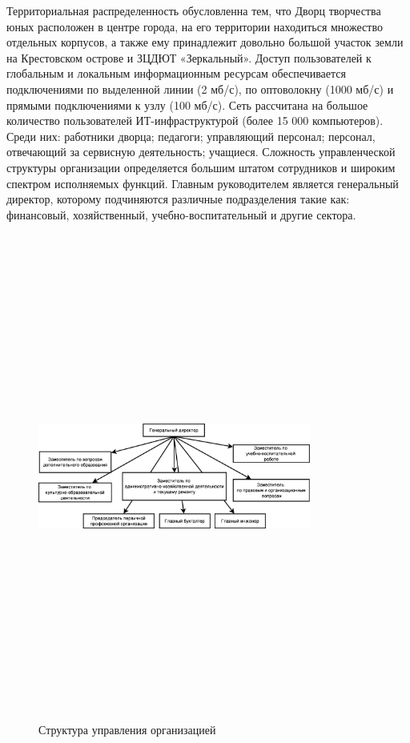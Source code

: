 \documentclass[utf8,usehyperref,12pt]{G7-32}
\begin{document}
Территориальная распределенность обусловленна тем, что Дворц творчества юных расположен в центре города, на его территории находиться множество отдельных корпусов, а также ему принадлежит довольно большой участок земли на Крестовском острове и ЗЦДЮТ «Зеркальный». Доступ пользователей к глобальным и локальным информационным ресурсам обеспечивается подключениями по выделенной линии
(2 мб/с), по оптоволокну (1000 мб/с) и прямыми подключениями к узлу (100 мб/с). Сеть рассчитана на большое количество пользователей ИТ-инфраструктурой (более
15 000 компьютеров). Среди них: работники дворца; педагоги; управляющий персонал;  персонал, отвечающий за сервисную деятельность; учащиеся. Сложность управленческой структуры организации определяется большим штатом сотрудников и широким спектром исполняемых функций. Главным руководителем является генеральный директор, которому подчиняются различные подразделения такие как: финансовый, хозяйственный, учебно-воспитательный и другие сектора.

\begin{figure}[ht]
   \centering%
   \includegraphics[height=160mm, width=0.8\textwidth, clip, keepaspectratio]{management_structure.eps}
   \caption{Структура управления организацией}\label{fig:fig_management_struct}
 \end{figure}
\end{document}

